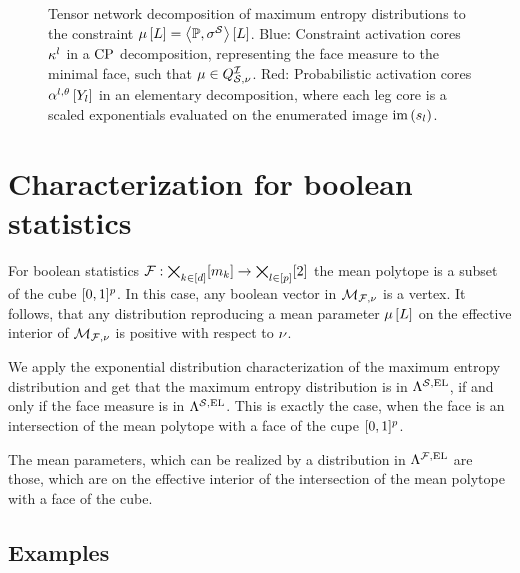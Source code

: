 \documentclass[aps,onecolumn,nofootinbib,pra]{article}
\begin{document}
    \begin{figure}[t]
        \begin{center}
            
        \end{center}
        \caption{
            Tensor network decomposition of maximum entropy distributions to the constraint $\mu\left[L\right]=\left\langle \mathbb{P},\sigma^{\mathcal{S}}\right\rangle \left[ L \right]$.
            Blue: Constraint activation cores $\kappa^{l}$ in a $\mathrm{CP}$ decomposition, representing the face measure to the minimal face, such that $\mu\in Q^{\mathcal{I}}_{\mathcal{S},\nu}$.
            Red: Probabilistic activation cores $\alpha^{l,\theta}\left[Y_{l}\right]$ in an elementary decomposition, where each leg core is a scaled exponentials evaluated on the enumerated image $\mathrm{im}\left(s_{l}\right)$.
        }\label{fig:maxEntropyActcore}
    \end{figure}


    \section{Characterization for boolean statistics}

    For boolean statistics $\mathcal{F}:\bigtimes_{k\in[d]}[m_{k}]\rightarrow\bigtimes_{l\in[p]}[2]$ the mean polytope is a subset of the cube $[0,1]^p$.
    In this case, any boolean vector in $\mathcal{M}_{\mathcal{F},\nu}$ is a vertex.
    It follows, that any distribution reproducing a mean parameter $\mu\left[L\right]$ on the effective interior of $\mathcal{M}_{\mathcal{F},\nu}$ is positive with respect to $\nu$.

    We apply the exponential distribution characterization of the maximum entropy distribution and get that the maximum entropy distribution is in $\Lambda^{\mathcal{S},\mathrm{EL}}$, if and only if the face measure is in $\Lambda^{\mathcal{S},\mathrm{EL}}$.
    This is exactly the case, when the face is an intersection of the mean polytope with a face of the cupe $[0,1]^p$.

    The mean parameters, which can be realized by a distribution in $\Lambda^{\mathcal{F},\mathrm{EL}}$ are those, which are on the effective interior of the intersection of the mean polytope with a face of the cube.


    \subsection{Examples}

    
\end{document}
